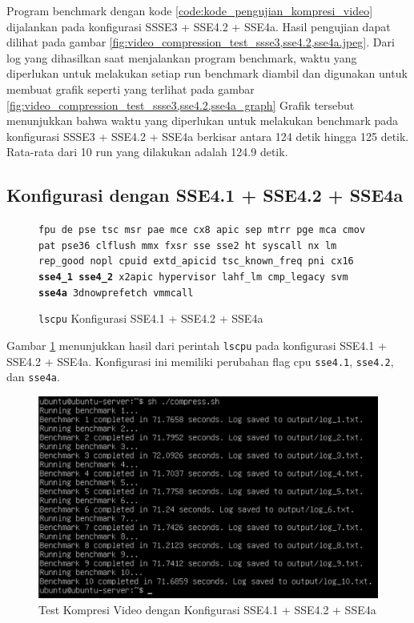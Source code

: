 Program benchmark dengan kode \ref{code:kode_pengujian_kompresi_video} dijalankan pada konfigurasi SSSE3 + SSE4.2 + SSE4a. Hasil pengujian dapat dilihat pada gambar \ref{fig:video_compression_test_ssse3,sse4.2,sse4a.jpeg}. Dari log yang dihasilkan saat menjalankan program benchmark, waktu yang diperlukan untuk melakukan setiap run benchmark diambil dan digunakan untuk membuat grafik seperti yang terlihat pada gambar \ref{fig:video_compression_test_ssse3,sse4.2,sse4a_graph} Grafik tersebut menunjukkan bahwa waktu yang diperlukan untuk melakukan benchmark pada konfigurasi SSSE3 + SSE4.2 + SSE4a berkisar antara 124 detik hingga 125 detik. Rata-rata dari 10 run yang dilakukan adalah 124.9 detik.
\subsection{Konfigurasi dengan SSE4.1 + SSE4.2 + SSE4a}
\begin{figure}
    \texttt{fpu de pse tsc msr pae mce cx8 apic sep mtrr pge mca cmov pat pse36 clflush mmx fxsr sse sse2 ht syscall nx lm rep\_good nopl cpuid extd\_apicid tsc\_known\_freq pni cx16 \textbf{sse4\_1} \textbf{sse4\_2} x2apic hypervisor lahf\_lm cmp\_legacy svm \textbf{sse4a} 3dnowprefetch vmmcall}
    \caption{\texttt{lscpu} Konfigurasi SSE4.1 + SSE4.2 + SSE4a}
    \label{fig:lscpu_video_compression_test_sse4.1,sse4.2,sse4a.jpeg}
\end{figure}

Gambar \ref{fig:lscpu_video_compression_test_sse4.1,sse4.2,sse4a.jpeg} menunjukkan hasil dari perintah \texttt{lscpu} pada konfigurasi SSE4.1 + SSE4.2 + SSE4a. Konfigurasi ini memiliki perubahan flag cpu \texttt{sse4.1}, \texttt{sse4.2}, dan \texttt{sse4a}.

\begin{figure}
    \centering
    \includegraphics[width=1\textwidth]
    {assets/pics/video-compression-test/sse4.1,sse4.2,sse4a.jpeg}
    \caption{Test Kompresi Video dengan Konfigurasi SSE4.1 + SSE4.2 + SSE4a}
    \label{fig:video_compression_test_sse4.1,sse4.2,sse4a.jpeg}
\end{figure}

